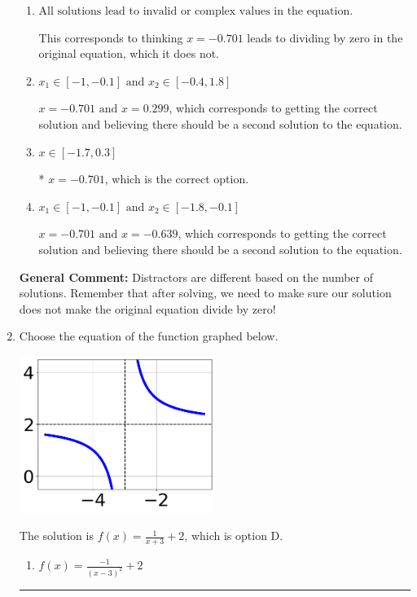 \documentclass{extbook}[14pt]
\newcommand{\litem}[1]{\item #1

\rule{\textwidth}{0.4pt}}
\begin{document}
\begin{enumerate}
{\begin{enumerate}[label=\Alph*.]
$x = 0.299$, which corresponds to not distributing the factor $4x + 2$ correctly when trying to eliminate the fraction.
\item \( \text{All solutions lead to invalid or complex values in the equation.} \)

This corresponds to thinking $x = -0.701$ leads to dividing by zero in the original equation, which it does not.
\item \( x_1 \in [-1, -0.1] \text{ and } x_2 \in [-0.4,1.8] \)

$x = -0.701 \text{ and } x = 0.299$, which corresponds to getting the correct solution and believing there should be a second solution to the equation.
\item \( x \in [-1.7,0.3] \)

* $x = -0.701$, which is the correct option.
\item \( x_1 \in [-1, -0.1] \text{ and } x_2 \in [-1.8,-0.1] \)

$x = -0.701 \text{ and } x = -0.639$, which corresponds to getting the correct solution and believing there should be a second solution to the equation.
\end{enumerate}

\textbf{General Comment:} Distractors are different based on the number of solutions. Remember that after solving, we need to make sure our solution does not make the original equation divide by zero!
}
\litem{
Choose the equation of the function graphed below.

\begin{center}
    \includegraphics[width=0.5\textwidth]{../Figures/rationalGraphToEquationCopyB.png}
\end{center}




The solution is \( f(x) = \frac{1}{x + 3} + 2 \), which is option D.\begin{enumerate}[label=\Alph*.]
\item \( f(x) = \frac{-1}{(x - 3)^2} + 2 \)


\end{enumerate}}
\end{enumerate}
\end{document}
